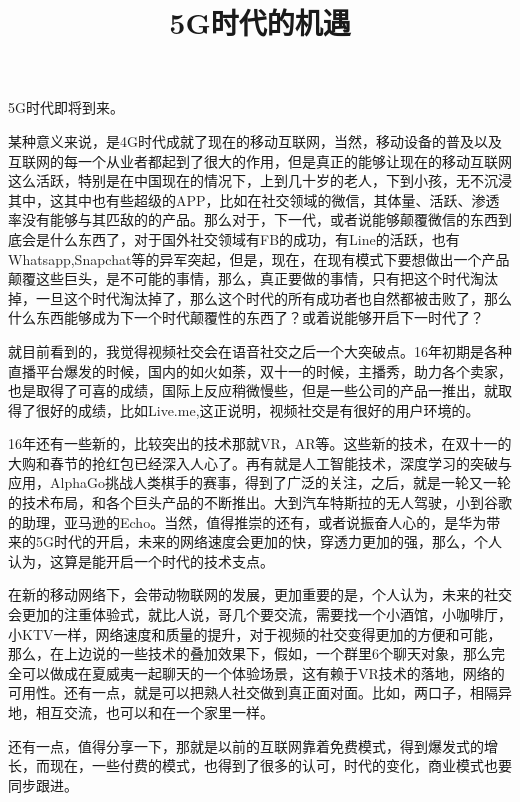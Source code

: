 \documentclass{article}
\title{5G时代的机遇}
\begin{document}
	5G时代即将到来。\par
	某种意义来说，是4G时代成就了现在的移动互联网，当然，移动设备的普及以及互联网的每一个从业者都起到了很大的作用，但是真正的能够让现在的移动互联网这么活跃，特别是在中国现在的情况下，上到几十岁的老人，下到小孩，无不沉浸其中，这其中也有些超级的APP，比如在社交领域的微信，其体量、活跃、渗透率没有能够与其匹敌的的产品。那么对于，下一代，或者说能够颠覆微信的东西到底会是什么东西了，对于国外社交领域有FB的成功，有Line的活跃，也有Whatsapp,Snapchat等的异军突起，但是，现在，在现有模式下要想做出一个产品颠覆这些巨头，是不可能的事情，那么，真正要做的事情，只有把这个时代淘汰掉，一旦这个时代淘汰掉了，那么这个时代的所有成功者也自然都被击败了，那么什么东西能够成为下一个时代颠覆性的东西了？或着说能够开启下一时代了？
	\par
	就目前看到的，我觉得视频社交会在语音社交之后一个大突破点。16年初期是各种直播平台爆发的时候，国内的如火如荼，双十一的时候，主播秀，助力各个卖家，也是取得了可喜的成绩，国际上反应稍微慢些，但是一些公司的产品一推出，就取得了很好的成绩，比如Live.me,这正说明，视频社交是有很好的用户环境的。
	\par
	16年还有一些新的，比较突出的技术那就VR，AR等。这些新的技术，在双十一的大购和春节的抢红包已经深入人心了。再有就是人工智能技术，深度学习的突破与应用，AlphaGo挑战人类棋手的赛事，得到了广泛的关注，之后，就是一轮又一轮的技术布局，和各个巨头产品的不断推出。大到汽车特斯拉的无人驾驶，小到谷歌的助理，亚马逊的Echo。当然，值得推崇的还有，或者说振奋人心的，是华为带来的5G时代的开启，未来的网络速度会更加的快，穿透力更加的强，那么，个人认为，这算是能开启一个时代的技术支点。
	\par
	在新的移动网络下，会带动物联网的发展，更加重要的是，个人认为，未来的社交会更加的注重体验式，就比人说，哥几个要交流，需要找一个小酒馆，小咖啡厅，小KTV一样，网络速度和质量的提升，对于视频的社交变得更加的方便和可能，那么，在上边说的一些技术的叠加效果下，假如，一个群里6个聊天对象，那么完全可以做成在夏威夷一起聊天的一个体验场景，这有赖于VR技术的落地，网络的可用性。还有一点，就是可以把熟人社交做到真正面对面。比如，两口子，相隔异地，相互交流，也可以和在一个家里一样。
	\par
	还有一点，值得分享一下，那就是以前的互联网靠着免费模式，得到爆发式的增长，而现在，一些付费的模式，也得到了很多的认可，时代的变化，商业模式也要同步跟进。
\end{document}
